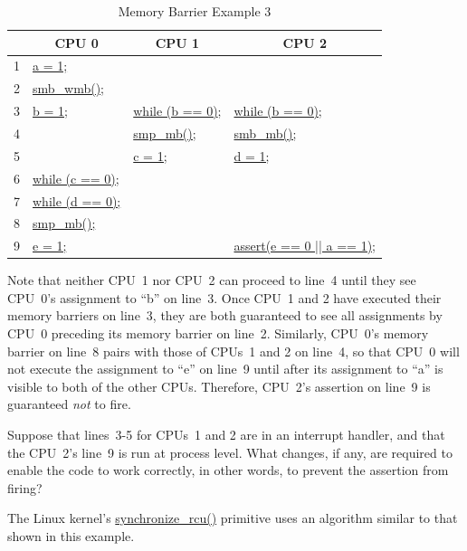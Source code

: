 \begin{table}
\scriptsize
\begin{center}
\begin{tabular}{r|l|l|l}
	& \multicolumn{1}{c|}{CPU 0} &
		\multicolumn{1}{c|}{CPU 1} &
			\multicolumn{1}{c}{CPU 2} \\
	\hline
	\hline
 1 &	\url{a = 1;} &			& \\
 2 &	\url{smb_wmb();} &		& \\
 3 &	\url{b = 1;} & \url{while (b == 0)}; & \url{while (b == 0)}; \\
 4 &		     & \url{smp_mb();}	& \url{smb_mb();} \\
 5 &		     & \url{c = 1;}	& \url{d = 1;} \\
 6 &	\url{while (c == 0);} &		& \\
 7 &	\url{while (d == 0);} &		& \\
 8 &	\url{smp_mb();} &		& \\
 9 &	\url{e = 1;} &			& \url{assert(e == 0 || a == 1);} \\
\end{tabular}
\end{center}
\caption{Memory Barrier Example 3}
\label{tab:app:whymb:Memory Barrier Example 3}
\end{table}

Note that neither CPU~1 nor CPU~2 can proceed to line~4 until they see
CPU~0's assignment to ``b'' on line~3.
Once CPU~1 and 2 have executed their memory barriers on line~3, they
are both guaranteed to see all assignments by CPU~0 preceding its memory
barrier on line~2.
Similarly, CPU~0's memory barrier on line~8 pairs with those of CPUs~1 and 2
on line~4, so that CPU~0 will not execute the assignment to ``e'' on
line~9 until after its assignment to ``a'' is visible to both of the
other CPUs.
Therefore, CPU~2's assertion on line~9 is guaranteed \emph{not} to fire.

\QuickQuiz{}
	Suppose that lines~3-5 for CPUs~1 and 2 are in an interrupt
	handler, and that the CPU~2's line~9 is run at process level.
	What changes, if any, are required to enable the code to work
	correctly, in other words, to prevent the assertion from firing?
 \QuickQuizEnd

The Linux kernel's \url{synchronize_rcu()} primitive uses an algorithm
similar to that shown in this example.

